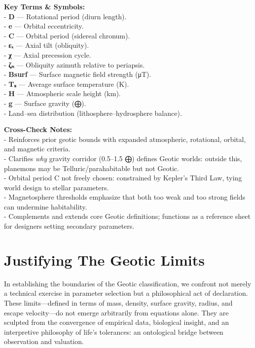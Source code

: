 \documentclass[
  letterpaper,
]{book}
\begin{document}
\textbf{Key Terms \& Symbols:}\\
- \textbf{D} --- Rotational period (diurn length).\\
- \textbf{e} --- Orbital eccentricity.\\
- \textbf{C} --- Orbital period (sidereal chronum).\\
- \textbf{εₓ} --- Axial tilt (obliquity).\\
- \textbf{χ} --- Axial precession cycle.\\
- \textbf{ζₙ} --- Obliquity azimuth relative to periapsis.\\
- \textbf{Bsurf} --- Surface magnetic field strength (μT).\\
- \textbf{Tₛ} --- Average surface temperature (K).\\
- \textbf{H} --- Atmospheric scale height (km).\\
- \textbf{g} --- Surface gravity (⨁).\\
- Land--sea distribution (lithosphere--hydrosphere balance).

\textbf{Cross-Check Notes:}\\
- Reinforces prior geotic bounds with expanded atmospheric, rotational,
orbital, and magnetic criteria.\\
- Clarifies \emph{why} gravity corridor (0.5--1.5 ⨁) defines Geotic
worlds: outside this, planemons may be Telluric/parahabitable but not
Geotic.\\
- Orbital period C not freely chosen: constrained by Kepler's Third Law,
tying world design to stellar parameters.\\
- Magnetosphere thresholds emphasize that both too weak and too strong
fields can undermine habitability.\\
- Complements and extends core Geotic definitions; functions as a
reference sheet for designers setting secondary parameters.

\chapter{Justifying The Geotic
Limits}\label{justifying-the-geotic-limits}

In establishing the boundaries of the Geotic classification, we confront
not merely a technical exercise in parameter selection but a
philosophical act of declaration. These limits---defined in terms of
mass, density, surface gravity, radius, and escape velocity---do not
emerge arbitrarily from equations alone. They are sculpted from the
convergence of empirical data, biological insight, and an interpretive
philosophy of life's tolerances: an ontological bridge between
observation and valuation.
\end{document}
